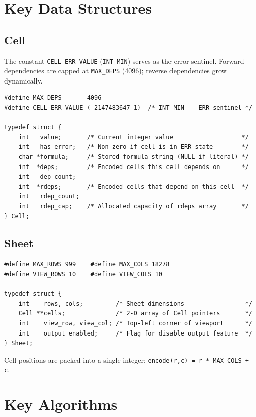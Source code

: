 \documentclass[11pt,a4paper]{article}
\begin{document}
\section{Key Data Structures}

\subsection{Cell}

The constant \texttt{CELL\_ERR\_VALUE} (\texttt{INT\_MIN}) serves as the error sentinel. Forward dependencies are capped at \texttt{MAX\_DEPS} (4096); reverse dependencies grow dynamically.

\begin{lstlisting}[style=cstyle, caption={Cell structure (sheet.h)}]
#define MAX_DEPS       4096
#define CELL_ERR_VALUE (-2147483647-1)  /* INT_MIN -- ERR sentinel */

typedef struct {
    int   value;       /* Current integer value                   */
    int   has_error;   /* Non-zero if cell is in ERR state        */
    char *formula;     /* Stored formula string (NULL if literal) */
    int  *deps;        /* Encoded cells this cell depends on      */
    int   dep_count;
    int  *rdeps;       /* Encoded cells that depend on this cell  */
    int   rdep_count;
    int   rdep_cap;    /* Allocated capacity of rdeps array       */
} Cell;
\end{lstlisting}

\subsection{Sheet}

\begin{lstlisting}[style=cstyle, caption={Sheet structure (sheet.h)}]
#define MAX_ROWS 999    #define MAX_COLS 18278
#define VIEW_ROWS 10    #define VIEW_COLS 10

typedef struct {
    int    rows, cols;         /* Sheet dimensions                 */
    Cell **cells;              /* 2-D array of Cell pointers       */
    int    view_row, view_col; /* Top-left corner of viewport      */
    int    output_enabled;     /* Flag for disable_output feature  */
} Sheet;
\end{lstlisting}

Cell positions are packed into a single integer: \texttt{encode(r,c) = r * MAX\_COLS + c}.

\section{Key Algorithms}
\end{document}
